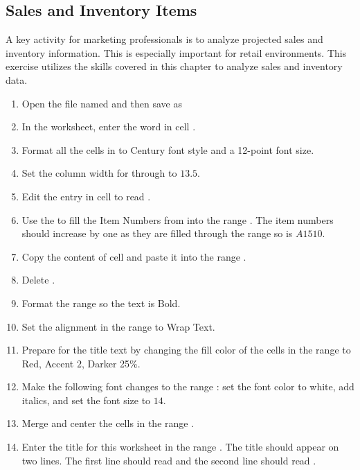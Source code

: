 \subsection{Sales and Inventory Items}

A key activity for marketing professionals is to analyze projected sales and inventory information. This is especially important for retail environments. This exercise utilizes the skills covered in this chapter to analyze sales and inventory data.

\begin{enumerate}
	\item Open the file named  and then save as 
	\item In the  worksheet, enter the word  in cell .
	\item Format all the cells in  to Century font style and a 12-point font size.
	\item Set the column width for  through  to $ 13.5 $.
	\item Edit the entry in cell  to read .
	\item Use the  to fill the Item Numbers from  into the range . The item numbers should increase by one as they are filled through the range so  is $ A1510 $.
	\item Copy the content of cell  and paste it into the range .
	\item Delete .
	\item Format the range  so the text is Bold.
	\item Set the alignment in the range  to Wrap Text.
	\item Prepare  for the title text by changing the fill color of the cells in the range  to Red, Accent $ 2 $, Darker 25\%.
	\item Make the following font changes to the range : set the font color to white, add italics, and set the font size to $ 14 $.
	\item Merge and center the cells in the range .
	\item Enter the title for this worksheet in the range . The title should appear on two lines. The first line should read  and the second line should read .

\end{enumerate}
